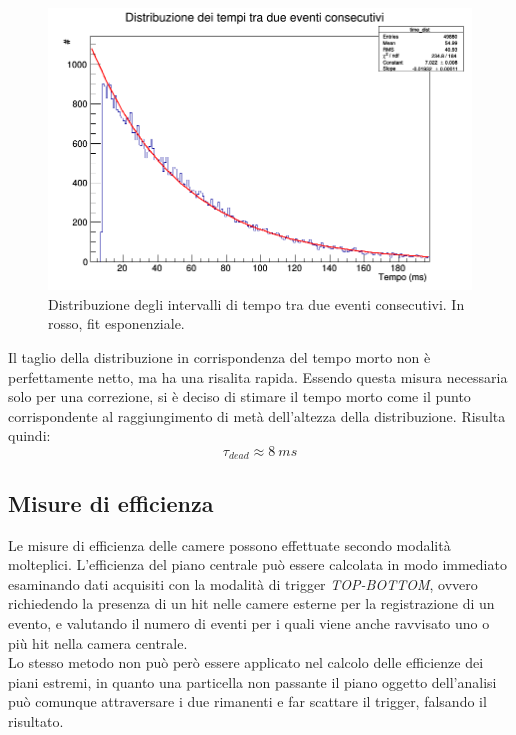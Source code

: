 \documentclass[8pt]{extarticle}
\begin{document}
\begin{figure}
\begin{center}
\includegraphics[scale=0.3]{dead_time1}
\caption{Distribuzione degli intervalli di tempo tra due eventi consecutivi. In rosso, fit esponenziale.}
\label{fig:dead_time}
\end{center}
\end{figure}

Il taglio della distribuzione in corrispondenza del tempo morto non è perfettamente netto, ma ha una risalita rapida. Essendo questa misura necessaria solo per una correzione, si è deciso di stimare il tempo morto come il punto corrispondente al raggiungimento di metà dell'altezza della distribuzione. Risulta quindi: \\
\[ \tau_{dead} \approx 8 \ ms \]



\subsection{Misure di efficienza}
Le misure di efficienza delle camere possono effettuate secondo modalità molteplici. L'efficienza del piano centrale può essere calcolata in modo immediato esaminando dati acquisiti con la modalità di trigger \textit{TOP-BOTTOM}, ovvero richiedendo la presenza di un hit nelle camere esterne per la registrazione di un evento, e valutando il numero di eventi per i quali viene anche ravvisato uno o più hit nella camera centrale. \\
Lo stesso metodo non può però essere applicato nel calcolo delle efficienze dei piani estremi, in quanto una particella non passante il piano oggetto dell'analisi può comunque attraversare i due rimanenti e far scattare il trigger, falsando il risultato.
\end{document}
